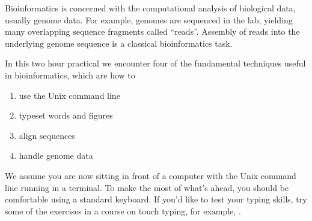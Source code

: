 Bioinformatics is concerned with the computational analysis of
biological data, usually genome data. For example, genomes are
sequenced in the lab, yielding many overlapping sequence fragments
called ``reads''. Assembly of reads into the underlying genome
sequence is a classical bioinformatics task.

In this two hour practical we encounter four of the fundamental
techniques useful in bioinformatics, which are how to
\begin{enumerate}
\item use the Unix command line
\item typeset words and figures
\item align sequences
\item handle genome data
\end{enumerate}
We assume you are now sitting in front of a computer with the Unix
command line running in a terminal. To make the most of what's ahead,
you should be comfortable using a standard keyboard. If you'd like to
test your typing skills, try some of the exercises in a course on
touch typing, for example, .
